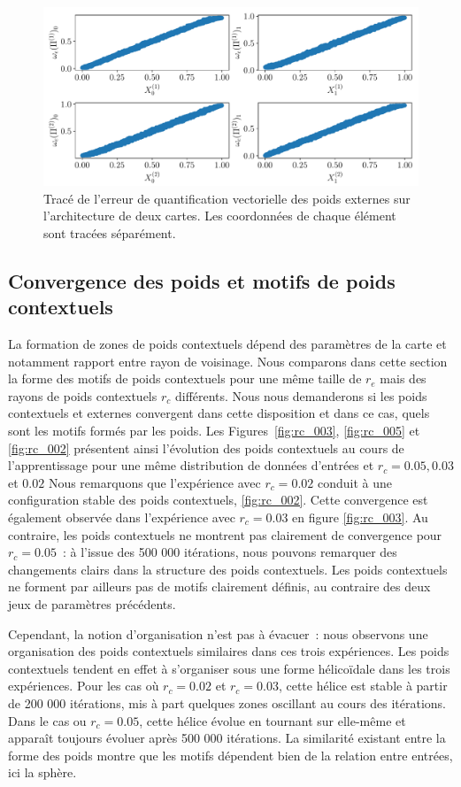 \documentclass[../main]{subfiles}
\begin{document}
\begin{figure}
	\includegraphics[width=\textwidth]{error-2SOM.pdf}
	\caption{Tracé de l'erreur de quantification vectorielle des poids externes sur l'architecture de deux cartes. Les coordonnées de chaque élément sont tracées séparément. \label{fig:qv2D}}
\end{figure}
\subsection{Convergence des poids et motifs de poids contextuels}

La formation de zones de poids contextuels dépend des paramètres de la carte et notamment  rapport entre rayon de voisinage.
Nous comparons dans cette section la forme des motifs de poids contextuels pour une même taille de $r_e$ mais des rayons de poids contextuels $r_c$ différents.
Nous nous demanderons si les poids contextuels et externes convergent dans cette disposition et dans ce cas, quels sont les motifs formés par les poids.
Les Figures~\ref{fig:rc_003}, \ref{fig:rc_005} et \ref{fig:rc_002} présentent ainsi l'évolution des poids contextuels au cours de l'apprentissage pour une même distribution de données d'entrées et $r_c = 0.05, 0.03$ et $0.02$
Nous remarquons que l'expérience avec $r_c = 0.02$ conduit à une configuration stable des poids contextuels, \ref{fig:rc_002}. Cette convergence est également observée dans l'expérience avec $r_c = 0.03$ en figure \ref{fig:rc_003}. Au contraire, les poids contextuels ne montrent pas clairement de convergence pour $r_c =0.05$~: à l'issue des 500 000 itérations, nous pouvons remarquer des changements clairs dans la structure des poids contextuels. Les poids contextuels ne forment par ailleurs pas de motifs clairement définis, au contraire des deux jeux de paramètres précédents.

Cependant, la notion d'organisation n'est pas à évacuer~: nous observons une organisation des poids contextuels similaires dans ces trois expériences. Les poids contextuels tendent en effet à s'organiser sous une forme hélicoïdale dans les trois expériences. Pour les cas où $r_c = 0.02$ et $r_c = 0.03$, cette hélice est stable à partir de 200 000 itérations, mis à part quelques zones oscillant au cours des itérations. 
Dans le cas ou $r_c = 0.05$, cette hélice évolue en tournant sur elle-même et apparaît toujours évoluer après 500 000 itérations.
La similarité existant entre la forme des poids montre que les motifs dépendent bien de la relation entre entrées, ici la sphère.
\end{document}
